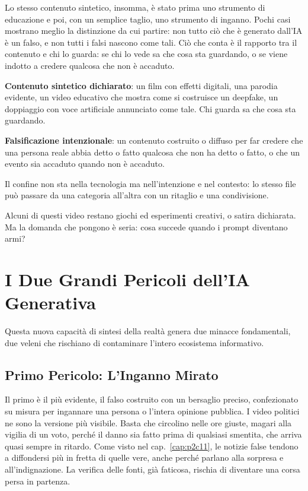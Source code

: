 Lo stesso contenuto sintetico, insomma, è stato prima uno strumento di educazione e poi, con un semplice taglio, uno strumento di inganno. Pochi casi mostrano meglio la distinzione da cui partire: non tutto ciò che è generato dall'IA è un falso, e non tutti i falsi nascono come tali. Ciò che conta è il rapporto tra il contenuto e chi lo guarda: se chi lo vede sa che cosa sta guardando, o se viene indotto a credere qualcosa che non è accaduto.

\begin{concetto}
\textbf{Contenuto sintetico dichiarato}: un film con effetti digitali, una parodia evidente, un video educativo che mostra come si costruisce un deepfake, un doppiaggio con voce artificiale annunciato come tale. Chi guarda sa che cosa sta guardando.

\textbf{Falsificazione intenzionale}: un contenuto costruito o diffuso per far credere che una persona reale abbia detto o fatto qualcosa che non ha detto o fatto, o che un evento sia accaduto quando non è accaduto.

\smallskip
\noindent Il confine non sta nella tecnologia ma nell'intenzione e nel contesto: lo stesso file può passare da una categoria all'altra con un ritaglio e una condivisione.
\end{concetto}

Alcuni di questi video restano giochi ed esperimenti creativi, o satira dichiarata. Ma la domanda che pongono è seria: cosa succede quando i prompt diventano armi?

\section{I Due Grandi Pericoli dell'IA Generativa}

Questa nuova capacità di sintesi della realtà genera due minacce fondamentali, due veleni che rischiano di contaminare l'intero ecosistema informativo.

\subsection{Primo Pericolo: L'Inganno Mirato}
Il primo è il più evidente, il falso costruito con un bersaglio preciso, confezionato su misura per ingannare una persona o l'intera opinione pubblica. I video politici ne sono la versione più visibile. Basta che circolino nelle ore giuste, magari alla vigilia di un voto, perché il danno sia fatto prima di qualsiasi smentita, che arriva quasi sempre in ritardo. Come visto nel cap.~\ref{cap:p2c11}, le notizie false tendono a diffondersi più in fretta di quelle vere, anche perché parlano alla sorpresa e all'indignazione. La verifica delle fonti, già faticosa, rischia di diventare una corsa persa in partenza.

